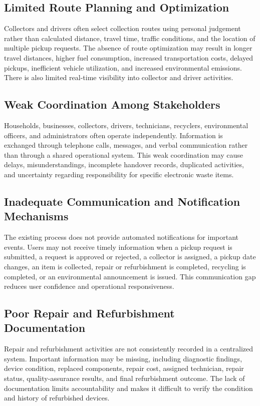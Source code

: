 \subsection{Limited Route Planning and Optimization}
Collectors and drivers often select collection routes using personal judgement
rather than calculated distance, travel time, traffic conditions, and the location of
multiple pickup requests. The absence of route optimization may result in longer
travel distances, higher fuel consumption, increased transportation costs, delayed
pickups, inefficient vehicle utilization, and increased environmental emissions.
There is also limited real-time visibility into collector and driver activities.

\subsection{Weak Coordination Among Stakeholders}
Households, businesses, collectors, drivers, technicians, recyclers, environmental
officers, and administrators often operate independently. Information is
exchanged through telephone calls, messages, and verbal communication rather
than through a shared operational system. This weak coordination may cause
delays, misunderstandings, incomplete handover records, duplicated activities,
and uncertainty regarding responsibility for specific electronic waste items.

\subsection{Inadequate Communication and Notification Mechanisms}
The existing process does not provide automated notifications for important
events. Users may not receive timely information when a pickup request is
submitted, a request is approved or rejected, a collector is assigned, a pickup date
changes, an item is collected, repair or refurbishment is completed, recycling is
completed, or an environmental announcement is issued. This communication
gap reduces user confidence and operational responsiveness.

\subsection{Poor Repair and Refurbishment Documentation}
Repair and refurbishment activities are not consistently recorded in a centralized
system. Important information may be missing, including diagnostic findings,
device condition, replaced components, repair cost, assigned technician, repair
status, quality-assurance results, and final refurbishment outcome. The lack of
documentation limits accountability and makes it difficult to verify the condition
and history of refurbished devices.

